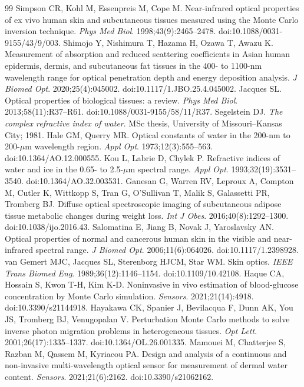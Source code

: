 \documentclass[11pt]{article}
\begin{document}
\begin{thebibliography}{99}
 Simpson CR, Kohl M, Essenpreis M, Cope M. Near-infrared optical properties of ex vivo human skin and subcutaneous tissues measured using the Monte Carlo inversion technique. \emph{Phys Med Biol}. 1998;43(9):2465--2478. doi:10.1088/0031-9155/43/9/003.
 Shimojo Y, Nishimura T, Hazama H, Ozawa T, Awazu K. Measurement of absorption and reduced scattering coefficients in Asian human epidermis, dermis, and subcutaneous fat tissues in the 400- to 1100-nm wavelength range for optical penetration depth and energy deposition analysis. \emph{J Biomed Opt}. 2020;25(4):045002. doi:10.1117/1.JBO.25.4.045002.
 Jacques SL. Optical properties of biological tissues: a review. \emph{Phys Med Biol}. 2013;58(11):R37--R61. doi:10.1088/0031-9155/58/11/R37.
 Segelstein DJ. \emph{The complex refractive index of water}. MSc thesis, University of Missouri--Kansas City; 1981.
 Hale GM, Querry MR. Optical constants of water in the 200-nm to 200-$\mu$m wavelength region. \emph{Appl Opt}. 1973;12(3):555--563. doi:10.1364/AO.12.000555.
 Kou L, Labrie D, Chylek P. Refractive indices of water and ice in the 0.65- to 2.5-$\mu$m spectral range. \emph{Appl Opt}. 1993;32(19):3531--3540. doi:10.1364/AO.32.003531.
 Ganesan G, Warren RV, Leproux A, Compton M, Cutler K, Wittkopp S, Tran G, O'Sullivan T, Malik S, Galassetti PR, Tromberg BJ. Diffuse optical spectroscopic imaging of subcutaneous adipose tissue metabolic changes during weight loss. \emph{Int J Obes}. 2016;40(8):1292--1300. doi:10.1038/ijo.2016.43.
 Salomatina E, Jiang B, Novak J, Yaroslavsky AN. Optical properties of normal and cancerous human skin in the visible and near-infrared spectral range. \emph{J Biomed Opt}. 2006;11(6):064026. doi:10.1117/1.2398928.
 van Gemert MJC, Jacques SL, Sterenborg HJCM, Star WM. Skin optics. \emph{IEEE Trans Biomed Eng}. 1989;36(12):1146--1154. doi:10.1109/10.42108.
 Haque CA, Hossain S, Kwon T-H, Kim K-D. Noninvasive in vivo estimation of blood-glucose concentration by Monte Carlo simulation. \emph{Sensors}. 2021;21(14):4918. doi:10.3390/s21144918.
 Hayakawa CK, Spanier J, Bevilacqua F, Dunn AK, You JS, Tromberg BJ, Venugopalan V. Perturbation Monte Carlo methods to solve inverse photon migration problems in heterogeneous tissues. \emph{Opt Lett}. 2001;26(17):1335--1337. doi:10.1364/OL.26.001335.
 Mamouei M, Chatterjee S, Razban M, Qassem M, Kyriacou PA. Design and analysis of a continuous and non-invasive multi-wavelength optical sensor for measurement of dermal water content. \emph{Sensors}. 2021;21(6):2162. doi:10.3390/s21062162.

\end{thebibliography}
\end{document}

